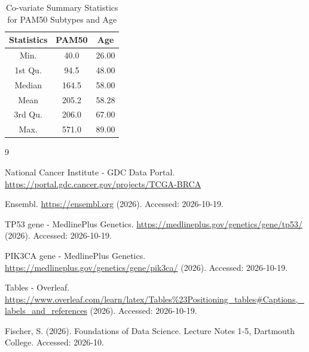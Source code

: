 \documentclass{article}
\begin{document}
\begin{table}[H]
    \centering
    \begin{tabular}{ccc}
       \hline
       Statistics & PAM50 & Age \\ [0.5ex]
       \hline\hline
       Min.  & 40.0  & 26.00 \\
       1st Qu.  & 94.5  & 48.00 \\
       Median  & 164.5  & 58.00 \\
       Mean  & 205.2  & 58.28 \\
       3rd Qu.  & 206.0  & 67.00 \\
       Max.  & 571.0  & 89.00 \\
       \hline
    \end{tabular}
    \caption{Co-variate Summary Statistics for PAM50 Subtypes and Age}
    \label{tab:covariates_summary}
\end{table}

\begin{thebibliography}{9}

National Cancer Institute - GDC Data Portal. \url{https://portal.gdc.cancer.gov/projects/TCGA-BRCA}

Ensembl. \url{https://ensembl.org} (2026). Accessed: 2026-10-19.

TP53 gene - MedlinePlus Genetics. \url{https://medlineplus.gov/genetics/gene/tp53/} (2026). Accessed: 2026-10-19.

PIK3CA gene - MedlinePlus Genetics. \url{https://medlineplus.gov/genetics/gene/pik3ca/} (2026). Accessed: 2026-10-19.

Tables - Overleaf. \url{https://www.overleaf.com/learn/latex/Tables%23Positioning_tables#Captions,_labels_and_references} (2026). Accessed: 2026-10-19.

Fischer, S. (2026). Foundations of Data Science. Lecture Notes 1-5, Dartmouth College. Accessed: 2026-10.

\end{thebibliography}
\end{document}
